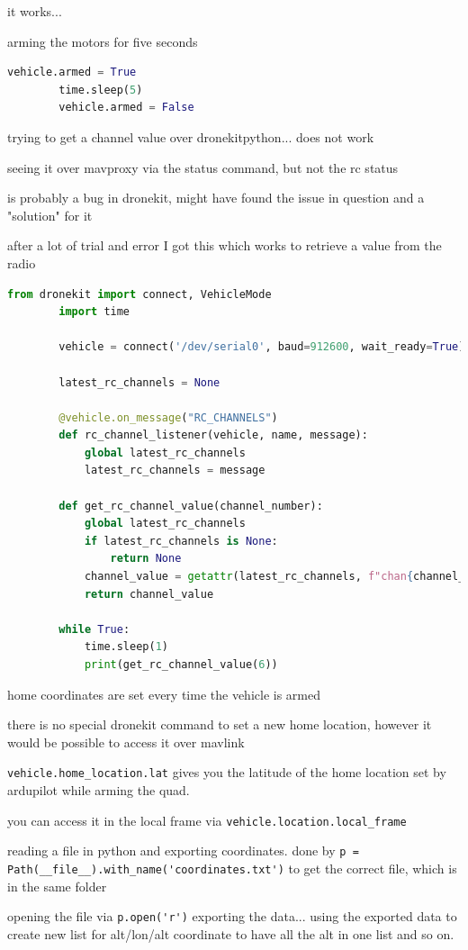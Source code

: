 \documentclass{article}
\begin{document}
	it works...
	
	arming the motors for five seconds
	\begin{lstlisting}[language=python]
		vehicle.armed = True
		time.sleep(5)
		vehicle.armed = False
	\end{lstlisting}
	
	
	trying to get a channel value over dronekitpython... does not work
	
	seeing it over mavproxy via the status command, but not the rc status
	
	is probably a bug in dronekit, might have found the issue in question and a  "solution" for it
	
	after a lot of trial and error I got this which works to retrieve a value from the radio
	\begin{lstlisting}[language=python]
		from dronekit import connect, VehicleMode
		import time
		
		vehicle = connect('/dev/serial0', baud=912600, wait_ready=True)
		
		latest_rc_channels = None
		
		@vehicle.on_message("RC_CHANNELS")
		def rc_channel_listener(vehicle, name, message):
			global latest_rc_channels
			latest_rc_channels = message
		
		def get_rc_channel_value(channel_number):
			global latest_rc_channels
			if latest_rc_channels is None:
				return None
			channel_value = getattr(latest_rc_channels, f"chan{channel_number}_raw", None)
			return channel_value
		
		while True: 
			time.sleep(1)
			print(get_rc_channel_value(6))
	\end{lstlisting}
	
	home coordinates are set every time the vehicle is armed
	
	there is no special dronekit command to set a new home location, however it would be possible to access it over mavlink
	
	\lstinline|vehicle.home_location.lat| gives you the latitude of the home location set by ardupilot while arming the quad.
	
	you can access it in the local frame via \lstinline|vehicle.location.local_frame|
	
	
	reading a file in python and exporting coordinates.
	done by \lstinline|p = Path(__file__).with_name('coordinates.txt')| to get the correct file, which is in the same folder
	
	opening the file via \lstinline|p.open('r')|
	exporting the data...
	using the exported data to create new list for alt/lon/alt coordinate to have all the alt in one list and so on.
	
\end{document}
